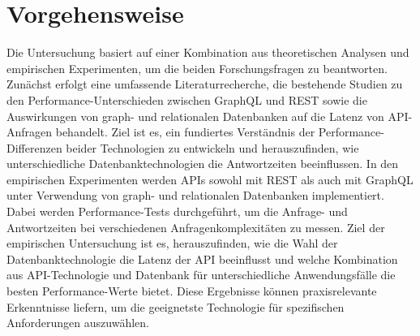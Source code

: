 \section{Vorgehensweise} %
\label{sec:vorgehensweise}
Die Untersuchung basiert auf einer Kombination aus theoretischen Analysen und empirischen Experimenten, um die beiden Forschungsfragen zu beantworten. Zunächst erfolgt eine umfassende Literaturrecherche, die bestehende Studien zu den Performance-Unterschieden zwischen GraphQL und REST sowie die Auswirkungen von graph- und relationalen Datenbanken auf die Latenz von API-Anfragen behandelt. Ziel ist es, ein fundiertes Verständnis der Performance-Differenzen beider Technologien zu entwickeln und herauszufinden, wie unterschiedliche Datenbanktechnologien die Antwortzeiten beeinflussen.
In den empirischen Experimenten werden APIs sowohl mit REST als auch mit GraphQL unter Verwendung von graph- und relationalen Datenbanken implementiert. Dabei werden Performance-Tests durchgeführt, um die Anfrage- und Antwortzeiten bei verschiedenen Anfragenkomplexitäten zu messen. Ziel der empirischen Untersuchung ist es, herauszufinden, wie die Wahl der Datenbanktechnologie die Latenz der API beeinflusst und welche Kombination aus API-Technologie und Datenbank für unterschiedliche Anwendungsfälle die besten Performance-Werte bietet. Diese Ergebnisse können praxisrelevante Erkenntnisse liefern, um die geeignetste Technologie für spezifischen Anforderungen auszuwählen.
